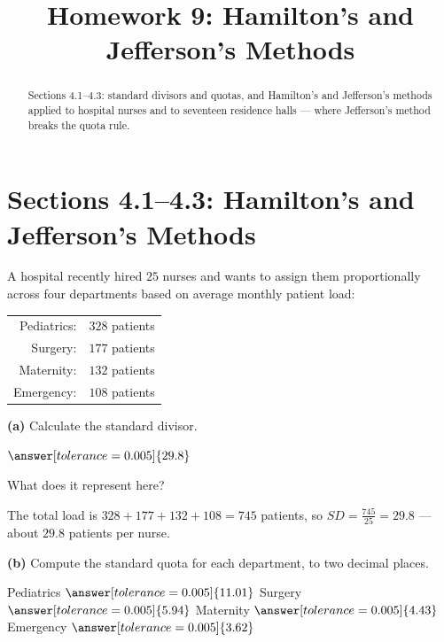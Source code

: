 \documentclass[12pt]{ximera}
\title{Homework 9: Hamilton's and Jefferson's Methods}
\begin{document}
\begin{abstract}
Sections 4.1--4.3: standard divisors and quotas, and Hamilton's and Jefferson's methods
applied to hospital nurses and to seventeen residence halls --- where Jefferson's method
breaks the quota rule.
\end{abstract}
\maketitle

\section*{Sections 4.1--4.3: Hamilton's and Jefferson's Methods}

\begin{problem}
A hospital recently hired $25$ nurses and wants to assign them proportionally across
four departments based on average monthly patient load:
\begin{center}
\begin{tabular}{rl}
Pediatrics: & $328$ patients\\
Surgery: & $177$ patients\\
Maternity: & $132$ patients\\
Emergency: & $108$ patients
\end{tabular}
\end{center}

\begin{prompt}
\textbf{(a)} Calculate the standard divisor.

$\answer[tolerance=0.005]{29.8}$

What does it represent here?
\begin{multipleChoice}
\end{multipleChoice}

\begin{feedback}
The total load is $328+177+132+108=745$ patients, so
$SD=\frac{745}{25}=29.8$ --- about $29.8$ patients per nurse.
\end{feedback}
\end{prompt}

\begin{prompt}
\textbf{(b)} Compute the standard quota for each department, to two decimal places.

Pediatrics $\answer[tolerance=0.005]{11.01}$ \quad Surgery $\answer[tolerance=0.005]{5.94}$
\quad Maternity $\answer[tolerance=0.005]{4.43}$ \quad Emergency $\answer[tolerance=0.005]{3.62}$


\end{prompt}
\end{problem}
\end{document}
